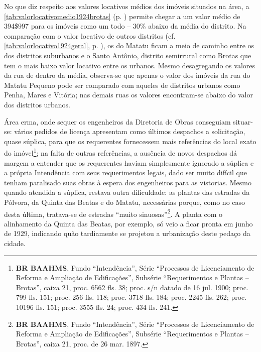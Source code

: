 No que diz respeito aos valores locativos médios dos imóveis situados na área, a \autoref{tab:valorlocativomedio1924brotas} (p. \pageref{tab:valorlocativomedio1924brotas}) permite chegar a um valor médio de 394\$997 para os imóveis como um todo -- 30\% abaixo da média do distrito. Na comparação com o valor locativo de outros distritos (cf. \autoref{tab:valorlocativo1924geral}, p. \pageref{tab:valorlocativo1924geral}), os do Matatu ficam a meio de caminho entre os dos distritos suburbanos e o Santo Antônio, distrito semirrural como Brotas que tem o mais baixo valor locativo entre os urbanos. Mesmo desagregando os valores da rua de dentro da média, observa-se que apenas o valor dos imóveis da rua do Matatu Pequeno pode ser comparado com aqueles de distritos urbanos como Penha, Mares e Vitória; nas demais ruas os valores encontram-se abaixo do valor dos distritos urbanos.





Área erma, onde sequer os engenheiros da Diretoria de Obras conseguiam situar-se: vários pedidos de licença apresentam como últimos despachos a solicitação, quase súplica, para que os requerentes fornecessem mais referências do local exato do imóvel\footnote{\textbf{BR BAAHMS}, Fundo ``Intendência'', Série ``Processos de Licenciamento de Reforma e Ampliação de Edificações'', Subsérie ``Requerimentos e Plantas -- Brotas'', caixa 21, proc. 6562 fls. 38; proc. s/n datado de 16 jul. 1900; proc. 799 fls. 151; proc. 256 fls. 118; proc. 3718 fls. 184; proc. 2245 fls. 262; proc. 10196 fls. 151; proc. 3555 fls. 24; proc. 434 fls. 241.}; na falta de outras referências, a ausência de novos despachos dá margem a entender que os requerentes haviam simplesmente ignorado a súplica e a própria Intendência com seus requerimentos legais, dado ser muito difícil que tenham paralisado suas obras à espera dos engenheiros para as vistorias. Mesmo quando atendida a súplica, restava outra dificuldade: as plantas das estradas da Pólvora, da Quinta das Beatas e do Matatu, necessárias porque, como no caso desta última, tratava-se de estradas ``muito sinuosas''\footnote{\textbf{BR BAAHMS}, Fundo ``Intendência'', Série ``Processos de Licenciamento de Reforma e Ampliação de Edificações'', Subsérie ``Requerimentos e Plantas -- Brotas'', caixa 21, proc. de 26 mar. 1897.}. A planta com o alinhamento da Quinta das Beatas, por exemplo, só veio a ficar pronta em junho de 1929, indicando quão tardiamente se projetou a urbanização deste pedaço da cidade.

